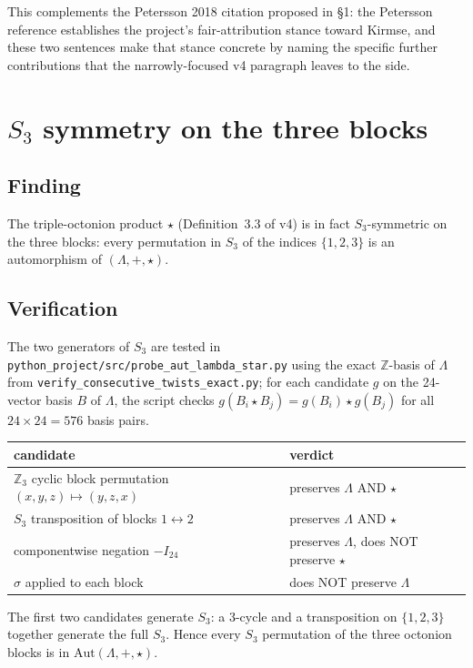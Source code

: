 \documentclass[11pt]{amsart}
\newcommand{\LL}{\Lambda}
\newcommand{\ZZ}{\mathbb{Z}}
\newcommand{\Aut}{\mathrm{Aut}}
\theoremstyle{remark}
\begin{document}
This complements the Petersson 2018 citation proposed in \S1: the
Petersson reference establishes the project's fair-attribution
stance toward Kirmse, and these two sentences make that stance
concrete by naming the specific further contributions that the
narrowly-focused v4 paragraph leaves to the side.

\section{$S_3$ symmetry on the three blocks}

\subsection*{Finding}

The triple-octonion product $\star$ (Definition~3.3 of v4) is in
fact $S_3$-symmetric on the three blocks: every permutation in
$S_3$ of the indices $\{1, 2, 3\}$ is an automorphism of
$(\LL, +, \star)$.

\subsection*{Verification}

The two generators of $S_3$ are tested in
\texttt{python\_project/src/probe\_aut\_lambda\_star.py} using the
exact $\ZZ$-basis of $\LL$ from
\texttt{verify\_consecutive\_twists\_exact.py}; for each candidate
$g$ on the 24-vector basis $B$ of $\LL$, the script checks
$g(B_i \star B_j) = g(B_i) \star g(B_j)$ for all $24 \times 24 = 576$
basis pairs.

\medskip
\begin{tabular}{ll}
\toprule
candidate & verdict \\
\midrule
$\ZZ_3$ cyclic block permutation $(x,y,z) \mapsto (y,z,x)$
  & preserves $\LL$ AND $\star$ \\
$S_3$ transposition of blocks $1 \leftrightarrow 2$
  & preserves $\LL$ AND $\star$ \\
componentwise negation $-I_{24}$
  & preserves $\LL$, does NOT preserve $\star$ \\
$\sigma$ applied to each block
  & does NOT preserve $\LL$ \\
\bottomrule
\end{tabular}
\medskip

\noindent
The first two candidates generate $S_3$: a 3-cycle and a
transposition on $\{1, 2, 3\}$ together generate the full $S_3$.
Hence every $S_3$ permutation of the three octonion blocks is in
$\Aut(\LL, +, \star)$.
\end{document}
